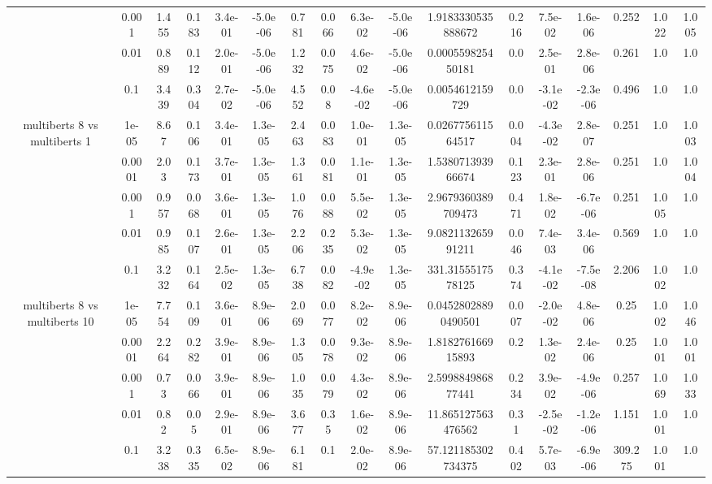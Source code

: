 \begin{tabular}{|c|c|c|c|c|c|c|c|c|c|c|c|c|c|c|c|c|}
 & 0.001 & 1.455 & 0.183 & 3.4e-01 & -5.0e-06 & 0.781 & 0.066 & 6.3e-02 & -5.0e-06 & 1.9183330535888672 & 0.216 & 7.5e-02 & 1.6e-06 & 0.252 & 1.022 & 1.005 \\
 & 0.01 & 0.889 & 0.112 & 2.0e-01 & -5.0e-06 & 1.232 & 0.075 & 4.6e-02 & -5.0e-06 & 0.000559825450181 & 0.0 & 2.5e-01 & 2.8e-06 & 0.261 & 1.0 & 1.0 \\
 & 0.1 & 3.439 & 0.304 & 2.7e-02 & -5.0e-06 & 4.552 & 0.08 & -4.6e-02 & -5.0e-06 & 0.0054612159729 & 0.0 & -3.1e-02 & -2.3e-06 & 0.496 & 1.0 & 1.0 \\
\hline
\multirow{5}{*}{multiberts 8 vs multiberts 1} & 1e-05 & 8.67 & 0.106 & 3.4e-01 & 1.3e-05 & 2.463 & 0.083 & 1.0e-01 & 1.3e-05 & 0.026775611564517 & 0.004 & -4.3e-02 & 2.8e-07 & 0.251 & 1.0 & 1.003 \\
 & 0.0001 & 2.03 & 0.173 & 3.7e-01 & 1.3e-05 & 1.361 & 0.081 & 1.1e-01 & 1.3e-05 & 1.538071393966674 & 0.123 & 2.3e-01 & 2.8e-06 & 0.251 & 1.0 & 1.004 \\
 & 0.001 & 0.957 & 0.068 & 3.6e-01 & 1.3e-05 & 1.076 & 0.088 & 5.5e-02 & 1.3e-05 & 2.9679360389709473 & 0.471 & 1.8e-02 & -6.7e-06 & 0.251 & 1.005 & 1.0 \\
 & 0.01 & 0.985 & 0.107 & 2.6e-01 & 1.3e-05 & 2.206 & 0.235 & 5.3e-02 & 1.3e-05 & 9.082113265991211 & 0.046 & 7.4e-03 & 3.4e-06 & 0.569 & 1.0 & 1.0 \\
 & 0.1 & 3.232 & 0.164 & 2.5e-02 & 1.3e-05 & 6.738 & 0.082 & -4.9e-02 & 1.3e-05 & 331.3155517578125 & 0.374 & -4.1e-02 & -7.5e-08 & 2.206 & 1.002 & 1.0 \\
\hline
\multirow{5}{*}{multiberts 8 vs multiberts 10} & 1e-05 & 7.754 & 0.109 & 3.6e-01 & 8.9e-06 & 2.069 & 0.077 & 8.2e-02 & 8.9e-06 & 0.04528028890490501 & 0.007 & -2.0e-02 & 4.8e-06 & 0.25 & 1.002 & 1.046 \\
 & 0.0001 & 2.264 & 0.282 & 3.9e-01 & 8.9e-06 & 1.305 & 0.078 & 9.3e-02 & 8.9e-06 & 1.818276166915893 & 0.2 & 1.3e-02 & 2.4e-06 & 0.25 & 1.001 & 1.001 \\
 & 0.001 & 0.73 & 0.066 & 3.9e-01 & 8.9e-06 & 1.035 & 0.079 & 4.3e-02 & 8.9e-06 & 2.599884986877441 & 0.234 & 3.9e-02 & -4.9e-06 & 0.257 & 1.069 & 1.033 \\
 & 0.01 & 0.82 & 0.05 & 2.9e-01 & 8.9e-06 & 3.677 & 0.35 & 1.6e-02 & 8.9e-06 & 11.865127563476562 & 0.31 & -2.5e-02 & -1.2e-06 & 1.151 & 1.001 & 1.0 \\
 & 0.1 & 3.238 & 0.335 & 6.5e-02 & 8.9e-06 & 6.181 & 0.1 & 2.0e-02 & 8.9e-06 & 57.121185302734375 & 0.402 & 5.7e-03 & -6.9e-06 & 309.275 & 1.001 & 1.0 \\

\end{tabular}
